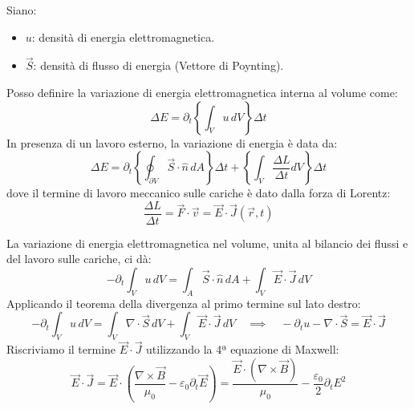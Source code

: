 \documentclass[openany,a4paper,12pt]{book}
\begin{document}
Siano:
\begin{itemize}
    \item $u$: densità di energia elettromagnetica.
    \item $\vec{S}$: densità di flusso di energia (Vettore di Poynting).
\end{itemize}

Posso definire la variazione di energia elettromagnetica interna al volume come:
\begin{equation}
    \Delta E = \partial_t \left\{ \int_V u \, dV \right\} \Delta t
\end{equation}
In presenza di un lavoro esterno, la variazione di energia è data da:
\begin{equation}
    \Delta E = \partial_t \left\{ \oint_{\partial V} \vec{S} \cdot \hat{n} \, dA \right\} \Delta t + \left\{ \int_V \frac{\Delta L}{\Delta t} dV \right\} \Delta t
\end{equation}
dove il termine di lavoro meccanico sulle cariche è dato dalla forza di Lorentz:
\begin{equation}
    \frac{\Delta L}{\Delta t} = \vec{F} \cdot \vec{v} = \vec{E} \cdot \vec{J}(\vec{r}, t)
\end{equation}

La variazione di energia elettromagnetica nel volume, unita al bilancio dei flussi e del lavoro sulle cariche, ci dà:
\begin{equation}
    -\partial_t \int_V u \, dV = \int_A \vec{S} \cdot \hat{n} \, dA + \int_V \vec{E} \cdot \vec{J} \, dV
\end{equation}
Applicando il teorema della divergenza al primo termine sul lato destro:
\begin{equation}
    -\partial_t \int_V u \, dV = \int_V \nabla \cdot \vec{S} \, dV + \int_V \vec{E} \cdot \vec{J} \, dV \quad \implies \quad - \partial_t u - \nabla \cdot \vec{S} = \vec{E} \cdot \vec{J}
\end{equation}
Riscriviamo il termine $\vec{E} \cdot \vec{J}$ utilizzando la 4ª equazione di Maxwell:
\begin{equation}
    \vec{E} \cdot \vec{J} = \vec{E} \cdot \left( \frac{\nabla \times \vec{B}}{\mu_0} - \varepsilon_0 \partial_t \vec{E} \right) = \frac{\vec{E} \cdot (\nabla \times \vec{B})}{\mu_0} - \frac{\varepsilon_0}{2} \partial_t E^2
\end{equation}
\end{document}
